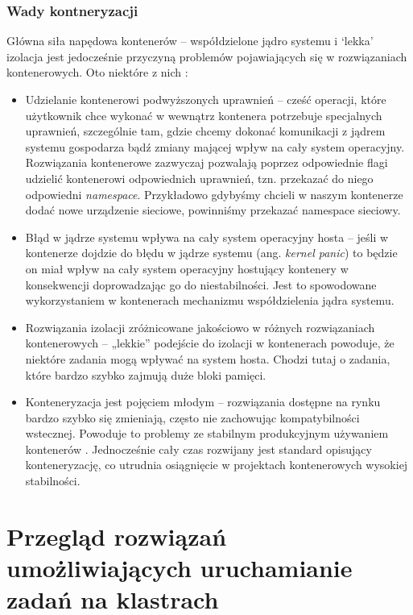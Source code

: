\documentclass[10pt,a4paper,titlepage,twoside]{report}
\begin{document}
\subsection{Wady kontneryzacji}\indent \indent Główna siła napędowa kontenerów – współdzielone jądro systemu i ‘lekka’ izolacja jest jedocześnie przyczyną problemów pojawiających się w rozwiązaniach kontenerowych. Oto niektóre z nich \cite{ad25}:

\begin{itemize}
	\item Udzielanie kontenerowi podwyższonych uprawnień – cześć operacji, które użytkownik chce wykonać w wewnątrz kontenera potrzebuje specjalnych uprawnień, szczególnie tam, gdzie chcemy dokonać komunikacji z jądrem systemu gospodarza bądź zmiany mającej wpływ na cały system operacyjny. Rozwiązania kontenerowe zazwyczaj pozwalają poprzez odpowiednie flagi udzielić kontenerowi odpowiednich uprawnień, tzn. przekazać do niego odpowiedni \textit{namespace}. Przykładowo gdybyśmy chcieli w naszym kontenerze dodać nowe urządzenie sieciowe, powinniśmy przekazać namespace sieciowy.
	\item Błąd w jądrze systemu wpływa na cały system operacyjny hosta – jeśli w kontenerze dojdzie do błędu w jądrze systemu (ang. \textit{kernel panic}) to będzie on miał wpływ na cały system operacyjny hostujący kontenery w konsekwencji doprowadzając go do niestabilności. Jest to spowodowane wykorzystaniem w kontenerach mechanizmu współdzielenia jądra systemu.
	\item Rozwiązania izolacji zróżnicowane jakościowo w różnych rozwiązaniach kontenerowych – „lekkie” podejście do izolacji w kontenerach powoduje, że niektóre zadania mogą wpływać na system hosta. Chodzi tutaj o zadania, które bardzo szybko zajmują duże bloki pamięci.
	\item Konteneryzacja jest pojęciem młodym – rozwiązania dostępne na rynku bardzo szybko się zmieniają, często nie zachowując kompatybilności wstecznej. Powoduje to problemy ze stabilnym produkcyjnym używaniem kontenerów \cite{ad25}. Jednocześnie cały czas rozwijany jest standard opisujący konteneryzację, co utrudnia osiągnięcie w projektach kontenerowych wysokiej stabilności.
\end{itemize}

\newpage

\onehalfspacing
\chapter{Przegląd rozwiązań umożliwiających uruchamianie zadań na klastrach}
\end{document}
